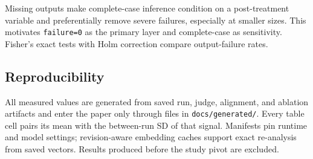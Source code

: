 Missing outputs make complete-case inference condition on a post-treatment
variable and preferentially remove severe failures, especially at smaller sizes.
This motivates \texttt{failure=0} as the primary layer and complete-case as
sensitivity. Fisher's exact tests with Holm correction compare output-failure
rates.

\subsection{Reproducibility}
\label{sec:reproducibility}

All measured values are generated from saved run, judge, alignment, and ablation
artifacts and enter the paper only through files in \texttt{docs/generated/}.
Every table cell pairs its mean with the between-run SD of that signal. Manifests pin
runtime and model settings; revision-aware embedding caches support exact
re-analysis from saved vectors. Results produced before the study pivot are excluded.

